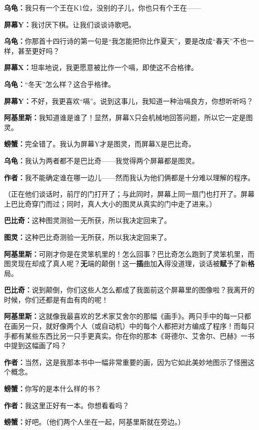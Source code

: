 \documentclass[
  12pt,
  twoside,
  openright,
  oldfontcommands,
]{memoir}
\newcommand{\kaitismall}[1]{{\kaitifamily\small #1}}
\newcommand{\heititext}[1]{{\sffamily\bfseries #1}}
\newcommand{\dialogname}[1]{{\sffamily\bfseries #1}}
\begin{document}
\dialogname{乌龟：}我只有一个王在K1位，没别的子儿，你也只有个王在------

\dialogname{屏幕Y：}我讨厌下棋。让我们谈谈诗歌吧。

\dialogname{乌龟：}你那首十四行诗的第一句是``我怎能把你比作夏天''，要是改成``春天''不也一样，甚至更好吗？

\dialogname{屏幕X：}坦率地说，我更愿意被比作一个嗝，即使这不合格律。

\dialogname{乌龟：}``冬天''怎么样？这合乎格律。

\dialogname{屏幕Y：}不好，我更喜欢``嗝''。说到这事儿，我知道一种治嗝良方，你想听听吗？

\dialogname{阿基里斯：}我知道谁是谁了！显然，屏幕X只会机械地回答问题，所以它一定是图灵。

\dialogname{螃蟹：}完全错了。我认为屏幕Y才是图灵，而屏幕X是巴比奇。

\dialogname{乌龟：}我认为两者都不是巴比奇------我觉得两个屏幕都是图灵。

\dialogname{作者：}我不能确定谁在哪一边儿------然而我认为他们俩都是十分难以理解的程序。

（正在他们谈话时，前厅的门打开了；与此同时，屏幕上同一扇门也打开了。屏幕上巴比奇穿门而过；同时，真人大小的图灵从真实的门中走了进来。）

\dialogname{巴比奇：}这种图灵测验一无所获，所以我决定回来了。

\dialogname{图灵：}这种巴比奇测验一无所获，所以我决定回来了。

\dialogname{阿基里斯：}可刚才你是在灵笨机里的！怎么回事？巴比奇怎么跑到了灵笨机里，而图灵现在却成了真人呢？\heititext{无}端的颠倒！这一\heititext{插}曲加\heititext{入}得没道理，谈话被\heititext{赋}予了新\heititext{格}局。

\dialogname{巴比奇：}说到颠倒，你们这些人怎么都成了我面前这个屏幕里的图像啦？我离开的时候，你们还都是有血有肉的呢！

\dialogname{阿基里斯：}这就像我最喜欢的艺术家艾舍尔的那幅《画手》。两只手中的每一只都在画另一只，就好像两个人（或自动机）中的每个人都把对方编成了程序！而每只手都有某些东西比另一只手更真实。你在你的那本《哥德尔、艾舍尔、巴赫》一书中提到这幅画了吗？

\dialogname{作者：}当然，这是我那本书中一幅非常重要的画，因为它如此美妙地图示了怪圈这个概念。

\dialogname{螃蟹：}你写的是本什么样的书？

\dialogname{作者：}我这里正好有一本。你想看看吗？

\dialogname{螃蟹：}好吧。\kaitismall{（他们两个人坐在一起，阿基里斯就在旁边。）}
\end{document}
